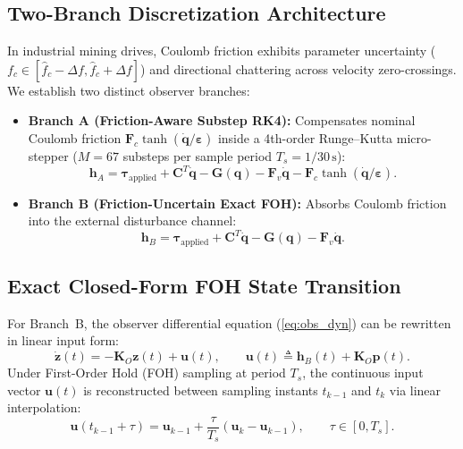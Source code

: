 \documentclass[journal]{IEEEtran}
\begin{document}
\subsection{Two-Branch Discretization Architecture}
In industrial mining drives, Coulomb friction exhibits parameter uncertainty ($f_c \in [\hat{f}_c - \Delta f, \hat{f}_c + \Delta f]$) and directional chattering across velocity zero-crossings. We establish two distinct observer branches:
\begin{itemize}
    \item \textbf{Branch A (Friction-Aware Substep RK4):} Compensates nominal Coulomb friction $\bm{F}_c \tanh(\dot{\bm{q}}/\bm{\varepsilon})$ inside a 4th-order Runge--Kutta micro-stepper ($M=67$ substeps per sample period $T_s = 1/30\,\mathrm{s}$):
    \begin{equation}
    \bm{h}_A = \bm{\tau}_{\mathrm{applied}} + \bm{C}^T \dot{\bm{q}} - \bm{G}(\bm{q}) - \bm{F}_v \dot{\bm{q}} - \bm{F}_c \tanh(\dot{\bm{q}}/\bm{\varepsilon}).
    \end{equation}
    \item \textbf{Branch B (Friction-Uncertain Exact FOH):} Absorbs Coulomb friction into the external disturbance channel:
    \begin{equation}
    \bm{h}_B = \bm{\tau}_{\mathrm{applied}} + \bm{C}^T \dot{\bm{q}} - \bm{G}(\bm{q}) - \bm{F}_v \dot{\bm{q}}.
    \end{equation}
\end{itemize}

\subsection{Exact Closed-Form FOH State Transition}
For Branch~B, the observer differential equation (\ref{eq:obs_dyn}) can be rewritten in linear input form:
\begin{equation}
\dot{\bm{z}}(t) = -\bm{K}_O \bm{z}(t) + \bm{u}(t), \qquad \bm{u}(t) \triangleq \bm{h}_B(t) + \bm{K}_O \bm{p}(t).
\label{eq:linear_obs}
\end{equation}
Under First-Order Hold (FOH) sampling at period $T_s$, the continuous input vector $\bm{u}(t)$ is reconstructed between sampling instants $t_{k-1}$ and $t_k$ via linear interpolation:
\begin{equation}
\bm{u}(t_{k-1} + \tau) = \bm{u}_{k-1} + \frac{\tau}{T_s}(\bm{u}_k - \bm{u}_{k-1}), \qquad \tau \in [0, T_s].
\end{equation}
\end{document}
